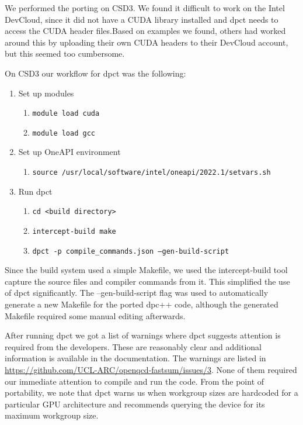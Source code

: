 We performed the porting on CSD3.
We found it difficult to work on the Intel DevCloud, since it did not have a CUDA library installed and dpct needs to access the CUDA header files.Based on examples we found, others had worked around this by uploading their own CUDA headers to their DevCloud account, but this seemed too cumbersome.

On CSD3 our workflow for dpct was the following:

\begin{enumerate}
	\item Set up modules
	      \begin{enumerate}
		      \item\texttt{module load cuda}
		      \item\texttt{module load gcc}
	      \end{enumerate}
	\item Set up OneAPI environment
	      \begin{enumerate}
		      \item\texttt{source /usr/local/software/intel/oneapi/2022.1/setvars.sh}
	      \end{enumerate}
	\item Run dpct
	      \begin{enumerate}
		      \item\texttt{cd <build directory>}
		      \item\texttt{intercept-build make}
		      \item\texttt{dpct -p compile\_commands.json --gen-build-script}
	      \end{enumerate}
\end{enumerate}

Since the build system used a simple Makefile, we used the intercept-build tool capture the source files and compiler commands from it.
This simplified the use of dpct significantly.
The --gen-build-script flag was used to automatically generate a new Makefile for the ported dpc++ code, although the generated Makefile required some manual editing afterwards.

After running dpct we got a list of warnings where dpct suggests attention is required from the developers.
These are reasonably clear and additional information is available in the documentation.
The warnings are listed in \url{https://github.com/UCL-ARC/openqcd-fastsum/issues/3}.
None of them required our immediate attention to compile and run the code.
From the point of portability, we note that dpct warns us when workgroup sizes are hardcoded for a particular GPU architecture and recommends querying the device for its maximum workgroup size.

